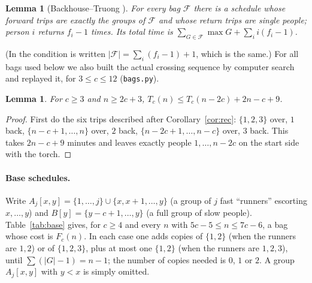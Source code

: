 \documentclass[11pt]{article}
\newtheorem{lemma}[theorem]{Lemma}
\theoremstyle{remark}
\begin{document}
\begin{lemma}[Backhouse--Truong {\cite[Theorem~1]{bt15}}]\label{lem:bt}
For every bag $\mathcal F$ there is a schedule whose forward trips are exactly the groups of $\mathcal F$ and whose return trips are single people; person $i$ returns $f_i-1$ times. Its total time is $\sum_{G\in\mathcal F}\max G+\sum_i i(f_i-1)$.
\end{lemma}

(In \cite{bt15} the condition is written $|\mathcal F|=\sum_i(f_i-1)+1$, which is the same.) For all bags used below we also built the actual crossing sequence by computer search and replayed it, for $3\le c\le12$ (\texttt{bags.py}).

\begin{lemma}\label{lem:cycle}
For $c\ge3$ and $n\ge2c+3$, $T_c(n)\le T_c(n-2c)+2n-c+9$.
\end{lemma}

\begin{proof}
First do the six trips described after Corollary~\ref{cor:rec}: $\{1,2,3\}$ over, $1$ back, $\{n-c+1,\dots,n\}$ over, $2$ back, $\{n-2c+1,\dots,n-c\}$ over, $3$ back. This takes $2n-c+9$ minutes and leaves exactly people $1,\dots,n-2c$ on the start side with the torch.
\end{proof}

\paragraph{Base schedules.} Write $A_j[x,y]=\{1,\dots,j\}\cup\{x,x+1,\dots,y\}$ (a group of $j$ fast ``runners'' escorting $x,\dots,y$) and $B[y]=\{y-c+1,\dots,y\}$ (a full group of slow people). Table~\ref{tab:base} gives, for $c\ge4$ and every $n$ with $5c-5\le n\le 7c-6$, a bag whose cost is $F_c(n)$. In each case one adds copies of $\{1,2\}$ (when the runners are $1,2$) or of $\{1,2,3\}$, plus at most one $\{1,2\}$ (when the runners are $1,2,3$), until $\sum(|G|-1)=n-1$; the number of copies needed is $0$, $1$ or $2$. A group $A_j[x,y]$ with $y<x$ is simply omitted.
\end{document}
